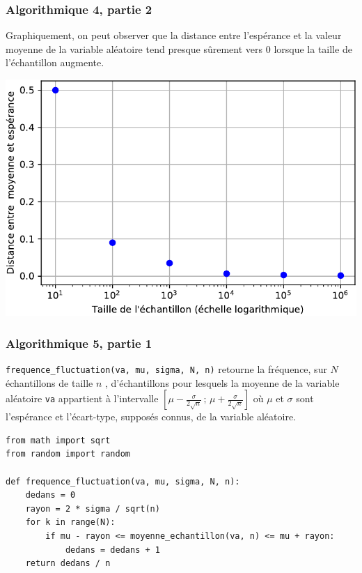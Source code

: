\documentclass[11pt, hyperref={urlcolor=red,%
            linkcolor=blue, %
            colorlinks=true}]{beamer}
\newcommand{\Interff}[2]{\left[#1\, ;\, #2\right]}
\begin{document}
\begin{frame}
\frametitle{Algorithmique 4,  partie 2}

Graphiquement, on peut observer que la distance entre l'espérance et la valeur moyenne de la variable aléatoire tend presque sûrement vers $0$ lorsque la taille de l'échantillon augmente.

\begin{center}
\includegraphics[scale=0.5]{images/distance-moyenne-esperance-crop.pdf}
\end{center}

\end{frame}

\begin{frame}[fragile]
\frametitle{Algorithmique 5,  partie 1}

\texttt{frequence\_fluctuation(va, mu, sigma, N, n)} retourne la fréquence, sur $N$ échantillons de taille $n$ , d'échantillons pour lesquels la moyenne de la variable aléatoire \texttt{va} appartient à  l'intervalle $\Interff{\mu - \frac{\sigma}{2 \sqrt{n}}}{\mu + \frac{\sigma}{2 \sqrt{n}}}$ où $\mu$ et $\sigma$ sont l'espérance et l'écart-type, supposés connus, de la variable aléatoire. 


\begin{lstlisting}[style=rond]
from math import sqrt
from random import random

def frequence_fluctuation(va, mu, sigma, N, n):
    dedans = 0
    rayon = 2 * sigma / sqrt(n)
    for k in range(N):
        if mu - rayon <= moyenne_echantillon(va, n) <= mu + rayon:
            dedans = dedans + 1
    return dedans / n
\end{lstlisting}

\end{frame}
\end{document}
